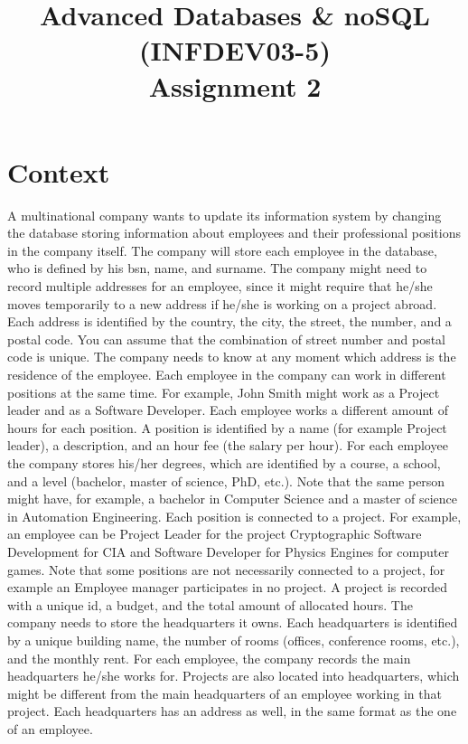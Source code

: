 \documentclass[10pt,a4paper]{article}
\title{Advanced Databases \& noSQL (INFDEV03-5) \\ Assignment 2}
\author { }
\date { }
\begin{document}
\maketitle

\section*{Context}
A multinational company wants to update its information system by changing the database storing information about employees and their professional positions in the company itself. 
The company will store each employee in the database, who is defined by his bsn, name, and surname. 
The company might need to record multiple addresses for an employee, since it might require that he/she moves temporarily to a new address if he/she is working on a project abroad. Each address is identified by the country, the city, the street, the number, and a postal code. You can assume that the combination of street number and postal code is unique. The company needs to know at any moment which address is the residence of the employee.
Each employee in the company can work in different positions at the same time. For example, John Smith might work as a Project leader and as a Software Developer. Each employee works a different amount of hours for each position. A position is identified by a name (for example Project leader), a description, and an hour fee (the salary per hour).
For each employee the company stores his/her degrees, which are identified by a course, a school, and a level (bachelor, master of science, PhD, etc.). Note that the same person might have, for example, a bachelor in Computer Science and a master of science in Automation Engineering.
Each position is connected to a project. For example, an employee can be Project Leader for the project Cryptographic Software Development for CIA and Software Developer for Physics Engines for computer games. Note that some positions are not necessarily connected to a project, for example an Employee manager participates in no project. A project is recorded with a unique id, a budget, and the total amount of allocated hours.
The company needs to store the headquarters it owns. Each headquarters is identified by a unique building name, the number of rooms (offices, conference rooms, etc.), and the monthly rent. For each employee, the company records the main headquarters he/she works for. Projects are also located into headquarters, which might be different from the main headquarters of an employee working in that project. Each headquarters has an address as well, in the same format as the one of an employee.
\end{document}
